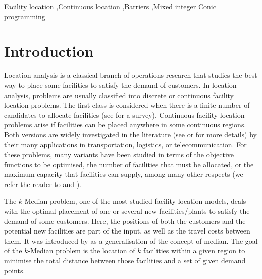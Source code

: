 \documentclass[a4paper,  review, authoryear, 1p.]{elsarticle}
\newcommand{\JP}[1]{{\color{blue}#1}}
\begin{document}
\begin{frontmatter}
		\begin{keyword}
			Facility location \sep Continuous location \sep Barriers \sep Mixed integer Conic programming 
		\end{keyword}
	\end{frontmatter}
	
	\section{Introduction}\label{section:introduction}

	Location analysis is a classical branch of operations research that studies the best way to place some facilities to satisfy the demand of customers. In location analysis, problems are usually classified into discrete or continuous facility location problems. The first class is considered when there is a finite number of candidates to allocate facilities (see \citet{ulukan2015} for a survey). Continuous facility location problems arise if facilities can be placed anywhere in some continuous regions. Both versions are widely investigated in the literature (see \citet{drezner2004} or \citet{nickel2007} for more details) by their many applications in transportation, logistics, or telecommunication. For these problems, many variants have been studied in terms of the objective functions to be optimised, the number of facilities that must be allocated, or the maximum capacity that facilities can supply, among many other respects (we refer the reader to \citet{kuehn1963} and \citet{puerto2008}).
	
	\JP{The $k$-Median problem, one of the most studied facility location models, deals with the optimal placement of one or several new facilities/plants to satisfy the demand of some customers. Here, the positions of both the customers and the potential new facilities are part of the input, as well as the travel costs between them. It was introduced by \cite{hakimi1965} as a generalisation of the concept of median. The goal of the $k$-Median problem is the location of $k$ facilities within a given region to minimise the total distance between those facilities and a set of given demand points.}
	
\end{document}
